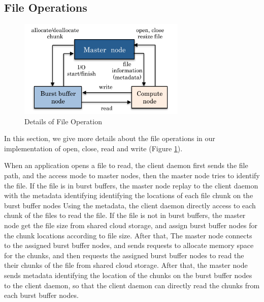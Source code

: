 
\subsection{File Operations}

\begin{figure}
\centering
\includegraphics[width=8cm]{img/file_operation-2}
\caption{Details of File Operation}
\label{implementation:file operation}
\end{figure}

In this section, we give more details about the file operations in our
implementation of open, close, read and write (Figure
\ref{implementation:file operation}).

When an application opens a file to read, the client daemon first sends the file
path, and the access mode to master nodes, then the master node tries to
identify the file. If the file is in burst buffers, the master node replay to the client
daemon with the metadata identifying identifying the locations of each file
chunk on the burst buffer nodes
Using the metadata, the client daemon directly access to each chunk of
the files to read the file.
If the file is not in burst buffers, the master node get the file size from
shared cloud storage, and assign burst buffer nodes for the chunk
locations according to file size. After that,
The master node connects to the assigned burst buffer nodes, and sends
requests to allocate memory space for the chunks, and then requests the assigned
burst buffer nodes to read the their chunks of the file from shared cloud storage. After
that, the master node sends metadata identifying the location of the
chunks on the burst buffer nodes to the client daemon, so that the client daemon
can directly read the chunks from each burst buffer nodes.


